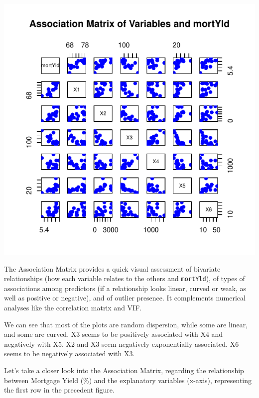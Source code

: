 \documentclass[
  11pt,
]{article}
\begin{document}
\includegraphics{Figs/unnamed-chunk-5-1.pdf}

The Association Matrix provides a quick visual assessment of bivariate
relationships (how each variable relates to the others and
\texttt{mortYld}), of types of associations among predictors (if a
relationship looks linear, curved or weak, as well as positive or
negative), and of outlier presence. It complements numerical analyses
like the correlation matrix and VIF.

We can see that most of the plots are random dispersion, while some are
linear, and some are curved. X3 seems to be positively associated with
X4 and negatively with X5. X2 and X3 seem negatively exponentially
associated. X6 seems to be negatively associated with X3.

Let's take a closer look into the Association Matrix, regarding the
relationship between Mortgage Yield (\%) and the explanatory variables
(x-axis), representing the first row in the precedent figure.
\end{document}
